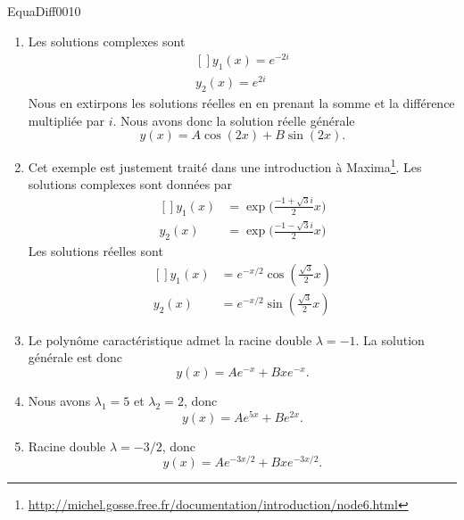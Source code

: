 \begin{corrige}{EquaDiff0010}
\begin{enumerate}
\item
	Les solutions complexes sont
	\begin{equation}
		\begin{aligned}[]
			y_1(x)= e^{-2i}\\
			y_2(x)= e^{2i}
		\end{aligned}
	\end{equation}
	Nous en extirpons les solutions réelles en en prenant la somme et la différence multipliée par $i$. Nous avons donc la solution réelle générale
	\begin{equation}
		y(x)=A\cos(2x)+B\sin(2x).
	\end{equation}
	

\item
	Cet exemple est justement traité dans une introduction à Maxima\footnote{\url{http://michel.gosse.free.fr/documentation/introduction/node6.html}}. Les solutions complexes sont données par
	\begin{equation}
		\begin{aligned}[]
			y_1(x)&=\exp\big( \frac{ -1+\sqrt{3}i }{ 2 }x \big)\\
			y_2(x)&=\exp\big( \frac{ -1-\sqrt{3}i }{ 2 }x \big)
		\end{aligned}
	\end{equation}
	Les solutions réelles sont
	\begin{equation}
		\begin{aligned}[]
			y_1(x)&= e^{-x/2}\cos(\frac{ \sqrt{3} }{ 2 }x)\\
			y_2(x)&= e^{-x/2}\sin(\frac{ \sqrt{3} }{ 2 }x)
		\end{aligned}
	\end{equation}
	
\item
	Le polynôme caractéristique admet la racine double $\lambda=-1$. La solution générale est donc
	\begin{equation}
		y(x)=A e^{-x}+Bx e^{-x}.
	\end{equation}
	
\item
	Nous avons $\lambda_1=5$ et $\lambda_2=2$, donc
	\begin{equation}
		y(x)=A e^{5x}+B e^{2x}.
	\end{equation}
	
\item
	Racine double $\lambda=-3/2$, donc
	\begin{equation}
		y(x)=A e^{-3x/2}+Bx e^{-3x/2}.
	\end{equation}

\end{enumerate}
\end{corrige}
